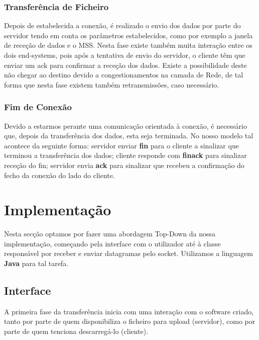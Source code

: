 \documentclass{llncs}
\begin{document}
\subsubsection{Transferência de Ficheiro}

\hspace{20.0cm}

Depois de estabelecida a conexão, é realizado o envio dos dados por parte do servidor tendo em conta os parâmetros estabelecidos, como por exemplo a janela de receção de dados e o MSS. Nesta fase existe também muita interação entre os dois end-systems, pois após a tentativa de envio do servidor, o cliente têm que enviar um ack para confirmar a receção dos dados. Existe a possibilidade deste não chegar ao destino devido a congestionamentos na camada de Rede, de tal forma que nesta fase existem também retransmissões, caso necessário.

\subsubsection{Fim de Conexão}

\hspace{20.0cm}

Devido a estarmos perante uma comunicação orientada à conexão, é necessário que, depois da transferência dos dados, esta seja terminada. No nosso modelo tal acontece da seguinte forma: servidor enviar \textbf{fin} para o cliente a sinalizar que terminou a transferência dos dados; cliente responde com \textbf{finack} para sinalizar receção do fin; servidor envia \textbf{ack} para sinalizar que recebeu a confirmação do fecho da conexão do lado do cliente.



\section{Implementação}

Nesta secção optamos por fazer uma abordagem Top-Down da nossa implementação, começando pela interface com o utilizador até à classe responsável por receber e enviar datagramas pelo socket. Utilizamos a linguagem \textbf{Java} para tal tarefa.


\subsection{Interface}

A primeira fase da transferência inicia com uma interação com o software criado, tanto por parte de quem disponibiliza o ficheiro para upload (servidor), como por parte de quem tenciona descarregá-lo (cliente).
\end{document}
